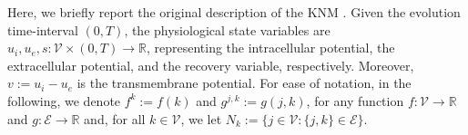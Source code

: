 \documentclass[a4paper,11pt]{article}
\theoremstyle{definition}
\numberwithin{equation}{section}
\newcommand{\R}{\mathbb{R}}
\newcommand{\V}{\mathcal{V}}
\begin{document}
Here, we briefly report the original description of the KNM \cite{JaegerTveito_KNM}. Given the evolution time-interval $(0,T)$, the physiological state variables are $u_i,u_e,s: \V \times (0,T) \to \R$, representing the intracellular potential, the extracellular potential, and the recovery variable, respectively. Moreover, $v:=  u_i - u_e$ is the transmembrane potential. For ease of notation, in the following, we denote $f^k:=f(k)$ and $g^{j,k}:=g(j,k)$, for any function $f:\V \to \R$ and $g:\mathcal{E}\to \R$ and, for all $k\in \V$, we let $N_k:=\{j \in \V: \{j,k\}\in \mathcal{E}\}$.
\end{document}
